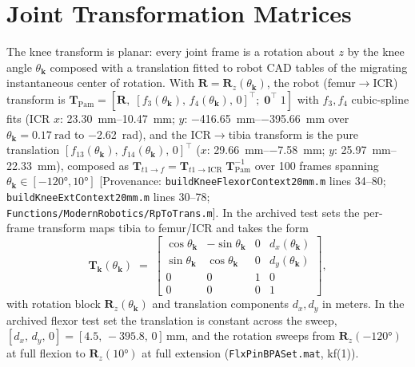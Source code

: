 \section{Joint Transformation Matrices}

The knee transform is planar: every joint frame is a rotation about $z$ by the knee angle $\theta_{\mathbf{k}}$ composed with a translation fitted to robot CAD tables of the migrating instantaneous center of rotation. With $\mathbf{R} = \mathbf{R}_{z}(\theta_{\mathbf{k}})$, the robot (femur$\to$ICR) transform is $\mathbf{T}_{\text{Pam}} = [\mathbf{R},\; [f_{3}(\theta_{\mathbf{k}}),\,f_{4}(\theta_{\mathbf{k}}),\,0]^{\top};\; \mathbf{0}^{\top}\;1]$ with $f_{3}, f_{4}$ cubic-spline fits (ICR $x$: \qtyrange{23.30}{10.47}{\mm}; $y$: \qtyrange{-416.65}{-395.66}{\mm} over $\theta_{\mathbf{k}} = \qty{0.17}{\radian}$ to \qty{-2.62}{\radian}), and the ICR$\to$tibia transform is the pure translation $[f_{13}(\theta_{\mathbf{k}}),\,f_{14}(\theta_{\mathbf{k}}),\,0]^{\top}$ ($x$: \qtyrange{29.66}{-7.58}{\mm}; $y$: \qtyrange{25.97}{22.33}{\mm}), composed as $\mathbf{T}_{t1\to f} = \mathbf{T}_{t1\to\text{ICR}}\;\mathbf{T}_{\text{Pam}}^{-1}$ over 100 frames spanning $\theta_{\mathbf{k}} \in [\ang{-120}, \ang{+10}]$ [Provenance: \nolinkurl{buildKneeFlexorContext20mm.m} lines 34--80; \nolinkurl{buildKneeExtContext20mm.m} lines 30--78; \nolinkurl{Functions/ModernRobotics/RpToTrans.m}]. In the archived test sets the per-frame transform maps tibia to femur/ICR and takes the form
\begin{equation}
    \mathbf{T}_{\mathbf{k}}(\theta_{\mathbf{k}}) \;=\;
    \begin{bmatrix}
    \cos\theta_{\mathbf{k}} & -\sin\theta_{\mathbf{k}} & 0 & d_{x}(\theta_{\mathbf{k}})\\
    \sin\theta_{\mathbf{k}} & \cos\theta_{\mathbf{k}} & 0 & d_{y}(\theta_{\mathbf{k}})\\
    0 & 0 & 1 & 0\\
    0 & 0 & 0 & 1
    \end{bmatrix},
    \label{eq:app_Tk}
\end{equation}
with rotation block $\mathbf{R}_{z}(\theta_{\mathbf{k}})$ and translation components $d_{x}, d_{y}$ in meters. In the archived flexor test set the translation is constant across the sweep, $[d_{x},\,d_{y},\,0] = [4.5,\,-395.8,\,0]\,\unit{\mm}$, and the rotation sweeps from $\mathbf{R}_{z}(\ang{-120})$ at full flexion to $\mathbf{R}_{z}(\ang{+10})$ at full extension (\nolinkurl{FlxPinBPASet.mat}, kf(1)).

